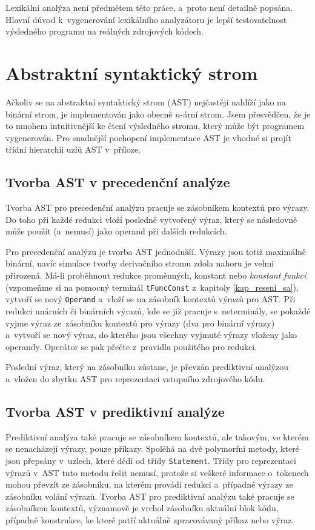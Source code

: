 Lexikální analýza není předmětem této práce, a~proto není detailně popsána.
Hlavní důvod k~vygenerování lexikálního analyzátoru je lepší testovatelnost výsledného programu na reálných zdrojových kódech.

\section{Abstraktní syntaktický strom}
Ačkoliv se na abstraktní syntaktický strom (AST) nejčastěji nahlíží jako na binární strom, je implementován jako obecně $n$-ární strom.
Jsem přesvědčen, že je to mnohem intuitivnější ke čtení výsledného stromu, který může být programem vygenerován.
Pro snadnější pochopení implementace AST je vhodné si projít třídní hierarchii uzlů AST v~příloze. 

\subsection*{Tvorba AST v precedenční analýze}
Tvorba AST pro precedenční analýzu pracuje se zásobníkem kontextů pro výrazy.
Do toho při každé redukci vloží posledně vytvořený výraz, který se následovně může použít (a~nemusí) jako operand při dalších redukcích.

Pro precedenční analýzu je tvorba AST jednodušší.
Výrazy jsou totiž maximálně binární, navíc simulace tvorby derivačního stromu zdola nahoru je velmi přirozená.
Má-li proběhnout redukce proměnných, konstant nebo \emph{konstant funkcí} (vzpomeňme si na pomocný terminál \texttt{tFuncConst} z~kapitoly \ref{kap_reseni_sa}), vytvoří se nový \texttt{Operand} a~vloží se na zásobník kontextů výrazů pro AST.
Při redukci unárních či binárních výrazů, kde se již pracuje s~neterminály, se pokaždé vyjme výraz ze~zásobníku kontextů pro výrazy (dva pro binární výrazy) a~vytvoří se nový výraz, do kterého jsou všechny vyjmuté výrazy vloženy jako operandy.
Operátor se pak přečte z~pravidla použitého pro redukci.

Poslední výraz, který na zásobníku zůstane, je převzán prediktivní analýzou a~vložen do zbytku AST pro reprezentaci vstupního zdrojového kódu.

\subsection*{Tvorba AST v prediktivní analýze}
Prediktivní analýza také pracuje se zásobníkem kontextů, ale takovým, ve kterém se nenacházejí výrazy, pouze příkazy.
Spoléhá na dvě polymorfní metody, které jsou přepsány v~uzlech, které dědí od třídy \texttt{Statement}.
Třídy pro reprezentaci výrazů v~AST tuto metodu řešit nemusí, protože si veškeré informace o~tokenech mohou převzít ze zásobníku, na kterém provádí redukci a~případné výrazy ze zásobníku volání výrazů.
Tvorba AST pro prediktivní analýzu také pracuje se zásobníkem kontextů, významově je vrchol zásobníku aktuální blok kódu, případně konstrukce, ke které patří aktuálně zpracovávaný příkaz nebo výraz.

